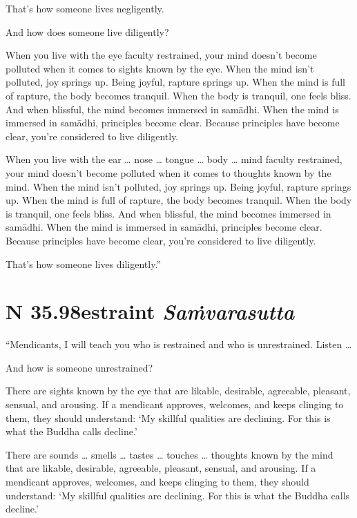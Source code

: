 \documentclass[12pt,openany]{book}%
\newcommand*{\suttatitleacronym}[1]{\smaller[2]{#1}\vspace*{.3em}}
\newcommand*{\suttatitletranslation}[1]{\linebreak{#1}}
\newcommand*{\suttatitleroot}[1]{\linebreak\smaller[2]\itshape{#1}}
\newcommand*{\tocacronym}[1]{\hspace*{-3.3em}{#1}\quad}
\newcommand*{\toctranslation}[1]{#1}
\newcommand*{\tocroot}[1]{(\textit{#1})}
\begin{document}
That’s how someone lives negligently. 

And how does someone live diligently? 

When you live with the eye faculty restrained, your mind doesn’t become polluted when it comes to sights known by the eye. When the mind isn’t polluted, joy springs up. Being joyful, rapture springs up. When the mind is full of rapture, the body becomes tranquil. When the body is tranquil, one feels bliss. And when blissful, the mind becomes immersed in \textsanskrit{samādhi}. When the mind is immersed in \textsanskrit{samādhi}, principles become clear. Because principles have become clear, you’re considered to live diligently. 

When you live with the ear … nose … tongue … body … mind faculty restrained, your mind doesn’t become polluted when it comes to thoughts known by the mind. When the mind isn’t polluted, joy springs up. Being joyful, rapture springs up. When the mind is full of rapture, the body becomes tranquil. When the body is tranquil, one feels bliss. And when blissful, the mind becomes immersed in \textsanskrit{samādhi}. When the mind is immersed in \textsanskrit{samādhi}, principles become clear. Because principles have become clear, you’re considered to live diligently. 

That’s how someone lives diligently.” 

%
\section*{{\suttatitleacronym SN 35.98}{\suttatitletranslation Restraint }{\suttatitleroot Saṁvarasutta}}
\addcontentsline{toc}{section}{\tocacronym{SN 35.98} \toctranslation{Restraint } \tocroot{Saṁvarasutta}}

“Mendicants, I will teach you who is restrained and who is unrestrained. Listen … 

And how is someone unrestrained? 

There are sights known by the eye that are likable, desirable, agreeable, pleasant, sensual, and arousing. If a mendicant approves, welcomes, and keeps clinging to them, they should understand: ‘My skillful qualities are declining. For this is what the Buddha calls decline.’ 

There are sounds … smells … tastes … touches … thoughts known by the mind that are likable, desirable, agreeable, pleasant, sensual, and arousing. If a mendicant approves, welcomes, and keeps clinging to them, they should understand: ‘My skillful qualities are declining. For this is what the Buddha calls decline.’ 
\end{document}
